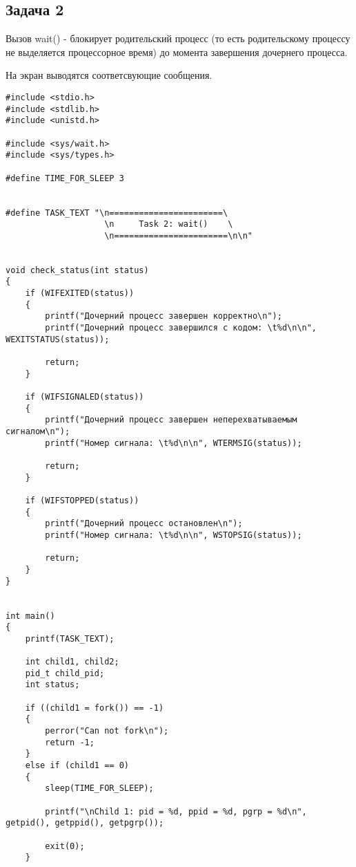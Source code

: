
\clearpage

\subsection*{Задача 2} 
Вызов wait() - блокирует родительский процесс (то есть родительскому процессу не выделяется процессорное время) до момента завершения дочернего процесса.

На экран выводятся соответсвующие сообщения.

\begin{lstlisting}[style={asm},label=lst:wait,caption=Вызов wait()]
#include <stdio.h>
#include <stdlib.h>
#include <unistd.h>

#include <sys/wait.h>
#include <sys/types.h>

#define TIME_FOR_SLEEP 3


#define TASK_TEXT "\n=======================\
                    \n     Task 2: wait()    \
                    \n=======================\n\n"


void check_status(int status)
{
    if (WIFEXITED(status))
    {
        printf("Дочерний процесс завершен корректно\n");
        printf("Дочерний процесс завершился с кодом: \t%d\n\n", WEXITSTATUS(status));

        return;
    }

    if (WIFSIGNALED(status))
    {
        printf("Дочерний процесс завершен неперехватываемым сигналом\n");
        printf("Номер сигнала: \t%d\n\n", WTERMSIG(status));

        return;
    }

    if (WIFSTOPPED(status))
    {
        printf("Дочерний процесс остановлен\n");
        printf("Номер сигнала: \t%d\n\n", WSTOPSIG(status));

        return;
    }
}


int main()
{
    printf(TASK_TEXT);

    int child1, child2;
    pid_t child_pid;
    int status;

    if ((child1 = fork()) == -1)
    {
        perror("Can not fork\n");
        return -1;
    }
    else if (child1 == 0)
    {
        sleep(TIME_FOR_SLEEP);

        printf("\nChild 1: pid = %d, ppid = %d, pgrp = %d\n", getpid(), getppid(), getpgrp());

        exit(0);
    }


\end{lstlisting}
